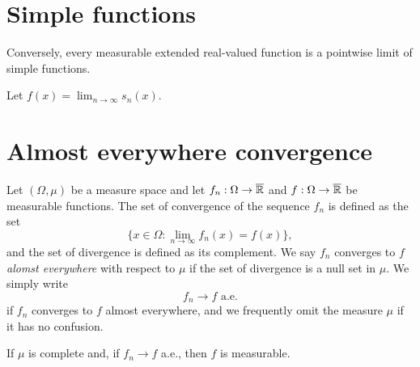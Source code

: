 \documentclass{../../large}
\begin{document}
\section{Simple functions}
\begin{prb}

Conversely, every measurable extended real-valued function is a pointwise limit of simple functions.

\end{prb}
\begin{pf}
Let $f(x)=\lim_{n\to\infty}s_n(x)$.

\end{pf}


\section{Almost everywhere convergence}

\begin{prb}
Let $(\Omega,\mu)$ be a measure space and let $f_n:\Omega\to\overline{\mathbb{R}}$ and $f:\Omega\to\overline{\mathbb{R}}$ be measurable functions.
The set of convergence of the sequence $f_n$ is defined as the set
\[\{x\in\Omega:\lim_{n\to\infty}f_n(x)=f(x)\},\]
and the set of divergence is defined as its complement.
We say $f_n$ converges to $f$ \emph{alomst everywhere} with respect to $\mu$ if the set of divergence is a null set in $\mu$.
We simply write
\[f_n\to f\text{ a.e.}\]
if $f_n$ converges to $f$ almost everywhere, and we frequently omit the measure $\mu$ if it has no confusion.
\begin{parts}
\item If $\mu$ is complete and, if $f_n\to f$ a.e., then $f$ is measurable.
\end{parts}
\end{prb}
\end{document}
